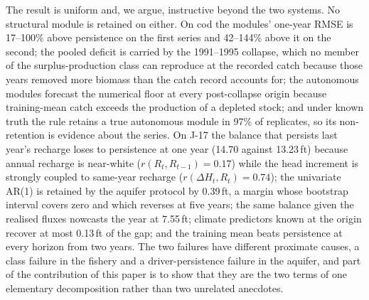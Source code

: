 \documentclass[preprint,11pt,authoryear]{elsarticle}
\theoremstyle{definition}
\theoremstyle{remark}
\begin{document}
The result is uniform and, we argue, instructive beyond the two systems. No structural module is retained on either. On cod the modules' one-year RMSE is 17--100\% above persistence on the first series and 42--144\% above it on the second; the pooled deficit is carried by the 1991--1995 collapse, which no member of the surplus-production class can reproduce at the recorded catch because those years removed more biomass than the catch record accounts for; the autonomous modules forecast the numerical floor at every post-collapse origin because training-mean catch exceeds the production of a depleted stock; and under known truth the rule retains a true autonomous module in 97\% of replicates, so its non-retention is evidence about the series. On J-17 the balance that persists last year's recharge loses to persistence at one year (14.70 against 13.23\,ft) because annual recharge is near-white ($r(R_t,R_{t-1})=0.17$) while the head increment is strongly coupled to same-year recharge ($r(\Delta H_t,R_t)=0.74$); the univariate AR(1) is retained by the aquifer protocol by 0.39\,ft, a margin whose bootstrap interval covers zero and which reverses at five years; the same balance given the realised fluxes nowcasts the year at 7.55\,ft; climate predictors known at the origin recover at most 0.13\,ft of the gap; and the training mean beats persistence at every horizon from two years. The two failures have different proximate causes, a class failure in the fishery and a driver-persistence failure in the aquifer, and part of the contribution of this paper is to show that they are the two terms of one elementary decomposition rather than two unrelated anecdotes.
\end{document}
